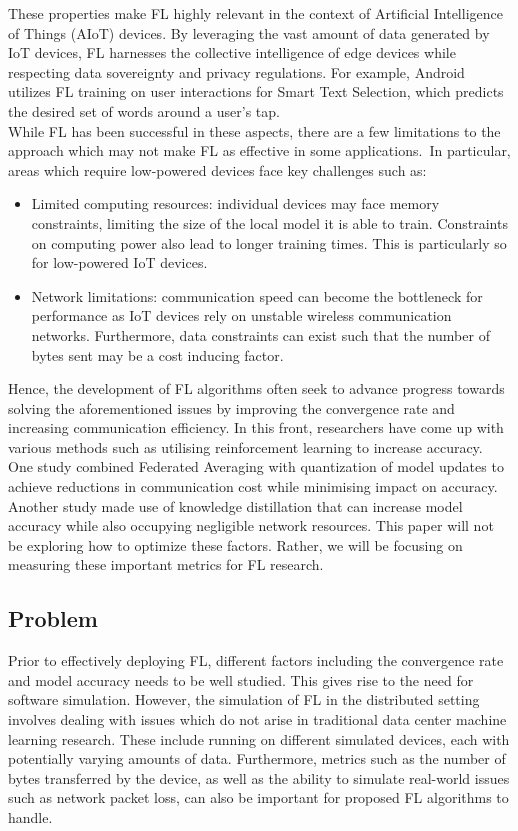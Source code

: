 \documentclass[12pt]{article}
\begin{document}
These properties make FL highly relevant in the context of Artificial Intelligence of Things
(AIoT) devices. By leveraging the vast amount of data generated by IoT devices, FL harnesses the
collective intelligence of edge devices while respecting data sovereignty and privacy
regulations. For example, Android utilizes FL training on user interactions for Smart Text Selection,
which predicts the desired set of words around a user's tap\cite{android}.\\

While FL has been successful in these aspects, there are a few limitations to the approach which may
not make FL as effective in some applications.\ In particular, areas which require low-powered
devices face key challenges such as:
\begin{itemize}
  \item Limited computing resources: individual devices may face memory constraints, limiting the
    size of the local model it is able to train. Constraints on computing power also lead to
    longer training times. This is particularly so for low-powered IoT devices.
  \item Network limitations: communication speed can become the bottleneck for performance as IoT
    devices rely on unstable wireless communication networks. Furthermore, data constraints can
    exist such that the number of bytes sent may be a cost inducing factor.
\end{itemize}

Hence, the development of FL algorithms often seek to advance progress towards solving the
aforementioned issues by improving the convergence rate and increasing communication efficiency. In
this front, researchers have come up with various methods such as utilising reinforcement learning
to increase accuracy\cite{Wang2020OptimizingFL}. One study combined Federated Averaging with quantization of model
updates to achieve reductions in communication cost while minimising impact on accuracy\cite{konečný2017federated}.
Another study made use of knowledge distillation\cite{hinton2015distilling} that can increase
model accuracy while also occupying negligible network resources\cite{liu2022efficient}. This paper
will not be exploring how to optimize these factors. Rather, we will be focusing on measuring these
important metrics for FL research.

\subsection{Problem}
Prior to effectively deploying FL, different factors including the convergence rate and
model accuracy needs to be well studied. This gives rise to the need for software simulation. However, the
simulation of FL in the distributed setting involves dealing with
issues which do not arise in traditional data center machine learning research. These include running on different simulated
devices, each with potentially varying amounts of data. Furthermore, metrics such as the number of
bytes transferred by the device, as well as the ability to simulate real-world issues such as
network packet loss, can also be important for proposed FL algorithms to handle.
\end{document}
